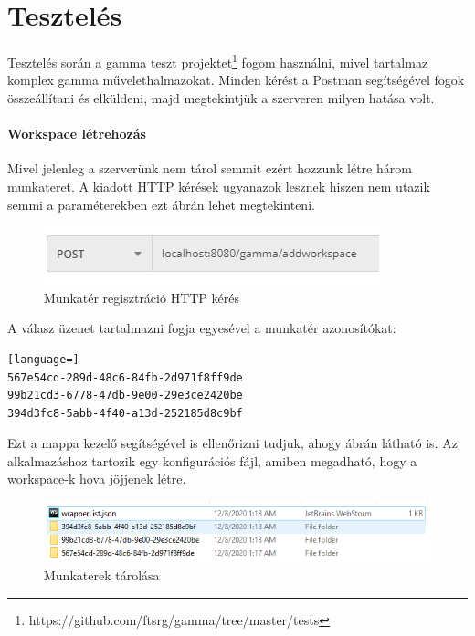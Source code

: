 \section{Tesztelés}

Tesztelés során a gamma teszt projektet\footnote{https://github.com/ftsrg/gamma/tree/master/tests} fogom használni, mivel tartalmaz komplex gamma művelethalmazokat. Minden kérést a Postman segítségével fogok összeállítani és elküldeni, majd megtekintjük a szerveren milyen hatása volt.

\paragraph{Workspace létrehozás} Mivel jelenleg a szerverünk nem tárol semmit ezért hozzunk létre három munkateret. A kiadott HTTP kérések ugyanazok lesznek hiszen nem utazik semmi a paraméterekben ezt  ábrán lehet megtekinteni.
\begin{figure}[!ht]
	\centering
	\includegraphics[keepaspectratio]{figures/addworkspace_test.PNG}
	\caption{Munkatér regisztráció HTTP kérés}
	\label{fig:addworkspace_test}
\end{figure}

\noindent A válasz üzenet tartalmazni fogja egyesével a  munkatér azonosítókat:
\begin{lstlisting}[language=]
567e54cd-289d-48c6-84fb-2d971f8ff9de
99b21cd3-6778-47db-9e00-29e3ce2420be
394d3fc8-5abb-4f40-a13d-252185d8c9bf
\end{lstlisting}

Ezt a mappa kezelő segítségével is ellenőrizni tudjuk, ahogy  ábrán látható is. Az alkalmazáshoz tartozik egy  konfigurációs fájl, amiben megadható, hogy a workspace-k hova jöjjenek létre.

\begin{figure}[!ht]
	\includegraphics[width=\textwidth, keepaspectratio]{figures/workspace_infile.PNG}
	\caption{Munkaterek tárolása}
	\label{fig:workspace_infile}
\end{figure}

